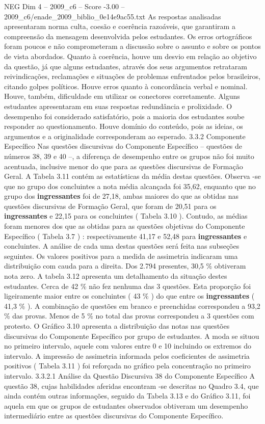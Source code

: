 \begin{textsample}{NEG Dim 4 – 2009\_c6 – Score -3.00 – 2009\_c6/enade\_2009\_biblio\_0e14e9ac55.txt}
As respostas analisadas apresentaram norma culta, coesão e coerência razoáveis, que garantiram a compreensão da mensagem desenvolvida pelos estudantes.
Os erros ortográficos foram poucos e não comprometeram a discussão sobre o assunto e sobre os pontos de vista abordados.
Quanto à coerência, houve um desvio em relação ao objetivo da questão, já que alguns estudantes, através dos seus argumentos retrataram reivindicações, reclamações e situações de problemas enfrentados pelos brasileiros, citando golpes políticos.
Houve erros quanto à concordância verbal e nominal.
Houve, também, dificuldade em utilizar os conectores corretamente.
Alguns estudantes apresentaram em suas respostas redundância e prolixidade.
O desempenho foi considerado satisfatório, pois a maioria dos estudantes soube responder ao questionamento.
Houve domínio do conteúdo, pois as ideias, os argumentos e a originalidade corresponderam ao esperado. 3.3.2 Componente Específico Nas questões discursivas do Componente Específico – questões de números 38, 39 e 40 –, a diferença de desempenho entre os grupos não foi muito acentuada, inclusive menor do que para as questões discursivas de Formação Geral.
A Tabela 3.11 contém as estatísticas da média destas questões.
Observa -se que no grupo dos concluintes a nota média alcançada foi 35,62, enquanto que no grupo dos \textbf{ingressantes} foi de 27,18, ambas maiores do que as obtidas nas questões discursivas de Formação Geral, que foram de 20,51 para os \textbf{ingressantes} e 22,15 para os concluintes ( Tabela 3.10 ).
Contudo, as médias foram menores dos que as obtidas para as questões objetivas do Componente Específico ( Tabela 3.7 ) : respectivamente 41,17 e 52,48 para \textbf{ingressantes} e concluintes.
A análise de cada uma destas questões será feita nas subseções seguintes.
Os valores positivos para a medida de assimetria indicaram uma distribuição com cauda para a direita.
Dos 2.794 presentes, 30,5 \% obtiveram nota zero.
A tabela 3.12 apresenta um detalhamento da situação destes estudantes.
Cerca de 42 \% não fez nenhuma das 3 questões.
Esta proporção foi ligeiramente maior entre os concluintes ( 43 \% ) do que entre os \textbf{ingressantes} ( 41,3 \% ).
A combinação de questões em branco e preenchidas correspondeu a 93,2 \% das provas.
Menos de 5 \% no total das provas correspondeu a 3 questões com protesto.
O Gráfico 3.10 apresenta a distribuição das notas nas questões discursivas do Componente Específico por grupo de estudantes.
A moda se situou no primeiro intervalo, aquele com valores entre 0 e 10 incluindo os extremos do intervalo.
A impressão de assimetria informada pelos coeficientes de assimetria positivos ( Tabela 3.11 ) foi reforçada no gráfico pela concentração no primeiro intervalo. 3.3.2.1 Análise da Questão Discursiva 38 do Componente Específico A questão 38, cujas habilidades aferidas encontram -se descritas no Quadro 3.4, que ainda contém outras informações, seguido da Tabela 3.13 e do Gráfico 3.11, foi aquela em que os grupos de estudantes observados obtiveram um desempenho intermediário entre as questões discursivas do Componente Específico.

\end{textsample}
